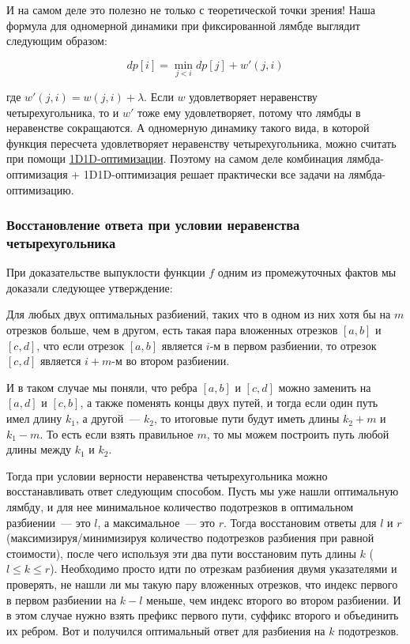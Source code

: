 И на самом деле это полезно не только с теоретической точки зрения! Наша формула для одномерной динамики при фиксированной лямбде выглядит следующим образом:

$$dp[i] = \min \limits_{j < i} dp[j] + w'(j, i)$$

где $w'(j, i) = w(j, i) + \lambda$. Если $w$ удовлетворяет неравенству четырехугольника, то и $w'$ тоже ему удовлетворяет, потому что лямбды в неравенстве сокращаются. А одномерную динамику такого вида, в которой функция пересчета удовлетворяет неравенству четырехугольника, можно считать при помощи \href{https://codeforces.com/blog/entry/93772}{1D1D-оптимизации}. Поэтому на самом деле комбинация лямбда-оптимизация + 1D1D-оптимизация решает практически все задачи на лямбда-оптимизацию.

\subsubsection{Восстановление ответа при условии неравенства четырехугольника}

При доказательстве выпуклости функции $f$ одним из промежуточных фактов мы доказали следующее утверждение:

\begin{lemma}
    Для любых двух оптимальных разбиений, таких что в одном из них хотя бы на $m$ отрезков больше, чем в другом, есть такая пара вложенных отрезков $[a, b]$ и $[c, d]$, что если отрезок $[a, b]$ является $i$-м в первом разбиении, то отрезок $[c, d]$ является $i+m$-м во втором разбиении.
\end{lemma}

И в таком случае мы поняли, что ребра $[a, b]$ и $[c, d]$ можно заменить на $[a, d]$ и $[c, b]$, а также поменять концы двух путей, и тогда если один путь имел длину $k_1$, а другой~--- $k_2$, то итоговые пути будут иметь длины $k_2 + m$ и $k_1 - m$. То есть если взять правильное $m$, то мы можем построить путь любой длины между $k_1$ и $k_2$.

Тогда при условии верности неравенства четырехугольника можно восстанавливать ответ следующим способом. Пусть мы уже нашли оптимальную лямбду, и для нее минимальное количество подотрезков в оптимальном разбиении~--- это $l$, а максимальное~--- это $r$. Тогда восстановим ответы для $l$ и $r$ (максимизируя/минимизируя количество подотрезков разбиения при равной стоимости), после чего используя эти два пути восстановим путь длины $k$ ($l \le k \le r$). Необходимо просто идти по отрезкам разбиения двумя указателями и проверять, не нашли ли мы такую пару вложенных отрезков, что индекс первого в первом разбиении на $k - l$ меньше, чем индекс второго во втором разбиении. И в этом случае нужно взять префикс первого пути, суффикс второго и объединить их ребром. Вот и получился оптимальный ответ для разбиения на $k$ подотрезков.

